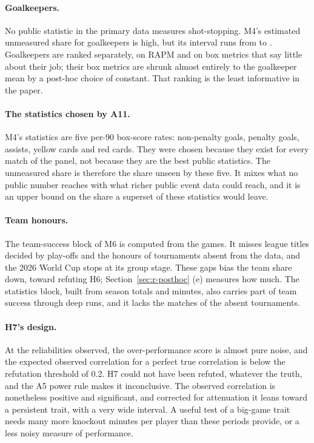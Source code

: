 \documentclass[11pt,a4paper]{article}
\begin{document}
\paragraph{Goalkeepers.}
No public statistic in the primary data measures shot-stopping. M4's estimated
unmeasured share for goalkeepers is high, but its interval runs from
\ShareGKLo{} to \ShareGKHi{}. Goalkeepers are ranked separately, on RAPM and on
box metrics that say little about their job; their box metrics are shrunk
almost entirely to the goalkeeper mean by a post-hoc choice of constant. That
ranking is the least informative in the paper.

\paragraph{The statistics chosen by A11.}
M4's statistics are five per-90 box-score rates: non-penalty goals, penalty
goals, assists, yellow cards and red cards. They were chosen because they exist
for every match of the panel, not because they are the best public statistics.
The unmeasured share is therefore the share unseen by these five. It mixes what
no public number reaches with what richer public event data could reach, and it
is an upper bound on the share a superset of these statistics would leave.

\paragraph{Team honours.}
The team-success block of M6 is computed from the games. It misses league
titles decided by play-offs and the honours of tournaments absent from the
data, and the 2026 World Cup stops at its group stage. These gaps bias the team
share down, toward refuting H6; Section~\ref{sec:r-posthoc} (e) measures how
much. The statistics block, built from season totals and minutes, also carries
part of team success through deep runs, and it lacks the matches of the absent
tournaments.

\paragraph{H7's design.}
At the reliabilities observed, the over-performance score is almost pure noise,
and the expected observed correlation for a perfect true correlation is below
the refutation threshold of 0.2. H7 could not have been refuted, whatever the
truth, and the A5 power rule makes it inconclusive. The observed correlation
is nonetheless positive and significant, and corrected for attenuation it
leans toward a persistent trait, with a very wide interval. A useful test of a
big-game trait needs many more knockout minutes per player than these periods
provide, or a less noisy measure of performance.
\end{document}
